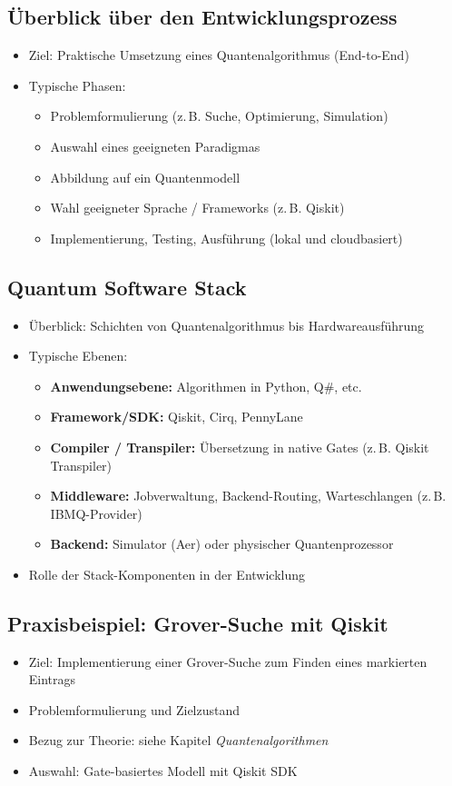\subsection{Überblick über den Entwicklungsprozess}
\begin{itemize}
    \item Ziel: Praktische Umsetzung eines Quantenalgorithmus (End-to-End)
    \item Typische Phasen:
    \begin{itemize}
        \item Problemformulierung (z.\,B. Suche, Optimierung, Simulation)
        \item Auswahl eines geeigneten Paradigmas
        \item Abbildung auf ein Quantenmodell
        \item Wahl geeigneter Sprache / Frameworks (z.\,B. Qiskit)
        \item Implementierung, Testing, Ausführung (lokal und cloudbasiert)
    \end{itemize}
\end{itemize}

\subsection{Quantum Software Stack}
\begin{itemize}
    \item Überblick: Schichten von Quantenalgorithmus bis Hardwareausführung
    \item Typische Ebenen:
    \begin{itemize}
        \item \textbf{Anwendungsebene:} Algorithmen in Python, Q\#, etc.
        \item \textbf{Framework/SDK:} Qiskit, Cirq, PennyLane
        \item \textbf{Compiler / Transpiler:} Übersetzung in native Gates (z.\,B. Qiskit Transpiler)
        \item \textbf{Middleware:} Jobverwaltung, Backend-Routing, Warteschlangen (z.\,B. IBMQ-Provider)
        \item \textbf{Backend:} Simulator (Aer) oder physischer Quantenprozessor
    \end{itemize}
    \item Rolle der Stack-Komponenten in der Entwicklung
\end{itemize}

\subsection{Praxisbeispiel: Grover-Suche mit Qiskit}
\begin{itemize}
    \item Ziel: Implementierung einer Grover-Suche zum Finden eines markierten Eintrags
    \item Problemformulierung und Zielzustand
    \item Bezug zur Theorie: siehe Kapitel \textit{Quantenalgorithmen}
    \item Auswahl: Gate-basiertes Modell mit Qiskit SDK
\end{itemize}

